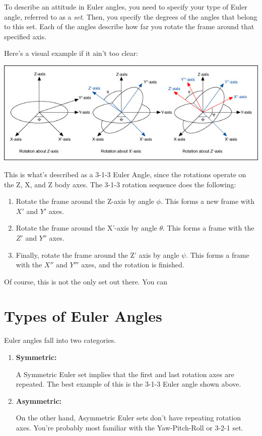 \documentclass[a4paper,14pt]{extreport}
\begin{document}
To describe an attitude in Euler angles, you need to specify your type of Euler angle, referred to as a \emph{set}. Then, you specify the degrees of the angles that belong to this set. Each of the angles describe how far you rotate the frame around that specified axis. 

Here's a visual example if it ain't too clear:

\begin{center}
\includegraphics[width=16cm]{euler_proper}
\end{center}

This is what's described as a 3-1-3 Euler Angle, since the rotations operate on the Z, X, and Z body axes. The 3-1-3 rotation sequence does the following:
\begin{enumerate}
\item Rotate the frame around the Z-axis by angle $\phi$. This forms a new frame with $X'$ and $Y'$ axes.
\item Rotate the frame around the X'-axis by angle $\theta$. This forms a frame with the $Z'$ and $Y''$ axes.
\item Finally, rotate the frame around the Z' axis by angle $\psi$. This forms a frame with the $X''$ and $Y'''$ axes, and the rotation is finished.
\end{enumerate}

Of course, this is not the only set out there. You can 

\section{Types of Euler Angles}
Euler angles fall into two categories.

\begin{enumerate}
\item{\textbf{Symmetric:}

A Symmetric Euler set implies that the first and last rotation axes are repeated. The best example of this is the 3-1-3 Euler angle shown above.}

\item{\textbf{Asymmetric:}

On the other hand, Asymmetric Euler sets don't have repeating rotation axes. You're probably most familiar with the Yaw-Pitch-Roll or 3-2-1 set.}
\end{enumerate}
\end{document}
